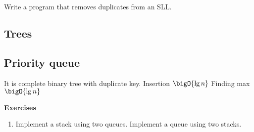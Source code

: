 \begin{example}
    Write a program that removes duplicates from an SLL.
\end{example}

\subsection{Trees}

\subsection{Priority queue}
It is complete binary tree with duplicate key.
Insertion \(\bigO{\lg n}\)
Finding max \(\bigO{\lg n}\)

\newline
{\Large\textbf{Exercises}}
\begin{enumerate}
    \item Implement a stack using two queues. Implement a queue using two stacks.
\end{enumerate}
\newpage
